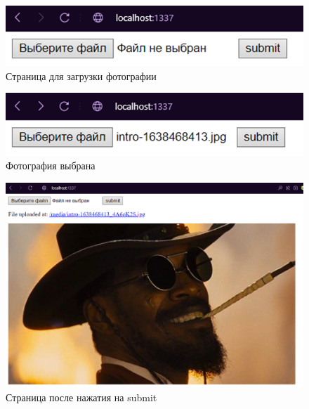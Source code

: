 \begin{figure}[!ht]
  \centering
  \includegraphics[scale=0.35]{ResearchNotes/rndhpc_not_gui_2022_11_04/picture2.png}
  \caption{Страница для загрузки фотографии}
  \label{picture2}
\end{figure}

\begin{figure}[!ht]
  \centering
  \includegraphics[scale=0.35]{ResearchNotes/rndhpc_not_gui_2022_11_04/picture3.png}
  \caption{Фотография выбрана}
  \label{picture3}
\end{figure}

\begin{figure}[!ht]
  \centering
  \includegraphics[scale=0.35]{ResearchNotes/rndhpc_not_gui_2022_11_04/picture4.png}
  \caption{Страница после нажатия на submit}
  \label{picture4}
\end{figure}
\noteattributes{}

